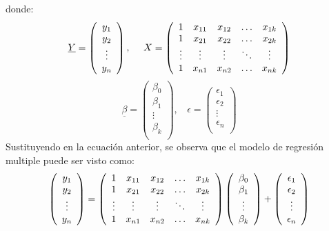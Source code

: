 \documentclass[
  a4paper,
  oneside,
  openany]{book}
\begin{document}
donde:
\[
\underline{Y}=
\left(
\begin{array}{c}
y_{1} \\
y_{2} \\
\vdots \\
y_{n}\\
\end{array}
\right),\ \ \ \  X=
\left(
\begin{array}{c c c c c}
1      & x_{11} & x_{12} & \ldots & x_{1k}\\ 
1      & x_{21} & x_{22} & \ldots & x_{2k}\\
\vdots & \vdots & \vdots & \ddots & \vdots\\
1      & x_{n1} & x_{n2} & \ldots & x_{nk}\\
\end{array}
\right)
\]
\[
\underline{\beta}=
\left(
\begin{array}{c}
\beta_{0} \\
\beta_{1} \\
\vdots \\
\beta_{k}\\
\end{array}
\right),\ \ \ \  \epsilon=
\left(
\begin{array}{c}
\epsilon_{1} \\
\epsilon_{2} \\
\vdots \\
\epsilon_{n}\\
\end{array}
\right)
\]
Sustituyendo en la ecuación anterior, se observa que el modelo de regresión multiple puede ser visto como:
\[
\left(
\begin{array}{c}
y_{1} \\
y_{2} \\
\vdots \\
y_{n}\\
\end{array}
\right)=
\left(
\begin{array}{c c c c c}
1      & x_{11} & x_{12} & \ldots & x_{1k}\\ 
1      & x_{21} & x_{22} & \ldots & x_{2k}\\
\vdots & \vdots & \vdots & \ddots & \vdots\\
1      & x_{n1} & x_{n2} & \ldots & x_{nk}\\
\end{array}
\right)
\left(
\begin{array}{c}
\beta_{0} \\
\beta_{1} \\
\vdots \\
\beta_{k}\\
\end{array}
\right) + 
\left(
\begin{array}{c}
\epsilon_{1} \\
\epsilon_{2} \\
\vdots \\
\epsilon_{n}\\
\end{array}
\right)
\]
\end{document}
